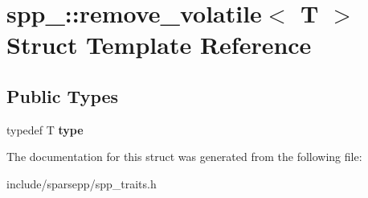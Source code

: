 \hypertarget{structspp___1_1remove__volatile}{}\section{spp\+\_\+\+:\+:remove\+\_\+volatile$<$ T $>$ Struct Template Reference}
\label{structspp___1_1remove__volatile}
\subsection*{Public Types}
\begin{DoxyCompactItemize}
\item 
typedef T {\bfseries type}\hypertarget{structspp___1_1remove__volatile_a13019911a4890d95104613cc36b8e51a}{}\label{structspp___1_1remove__volatile_a13019911a4890d95104613cc36b8e51a}

\end{DoxyCompactItemize}


The documentation for this struct was generated from the following file\+:\begin{DoxyCompactItemize}
\item 
include/sparsepp/spp\+\_\+traits.\+h\end{DoxyCompactItemize}
